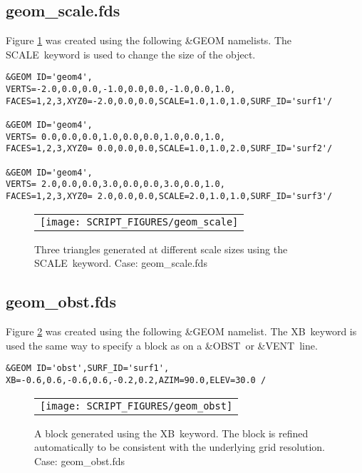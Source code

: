 \documentclass[12pt]{article}
\begin{document}
\subsection{geom\_scale.fds}
Figure \ref{fig:geom_scale} was created using the following \&GEOM namelists.
The {\ct SCALE}\ keyword is used to change the size of the object.

{\small
\begin{verbatim}
&GEOM ID='geom4',
VERTS=-2.0,0.0,0.0,-1.0,0.0,0.0,-1.0,0.0,1.0,
FACES=1,2,3,XYZ0=-2.0,0.0,0.0,SCALE=1.0,1.0,1.0,SURF_ID='surf1'/

&GEOM ID='geom4',
VERTS= 0.0,0.0,0.0,1.0,0.0,0.0,1.0,0.0,1.0,
FACES=1,2,3,XYZ0= 0.0,0.0,0.0,SCALE=1.0,1.0,2.0,SURF_ID='surf2'/

&GEOM ID='geom4',
VERTS= 2.0,0.0,0.0,3.0,0.0,0.0,3.0,0.0,1.0,
FACES=1,2,3,XYZ0= 2.0,0.0,0.0,SCALE=2.0,1.0,1.0,SURF_ID='surf3'/
\end{verbatim}
}

\begin{figure}[\figoptions]
\begin{center}
\begin{tabular}{c}
 \texttt{[image: SCRIPT\_FIGURES/geom\_scale]}
  \end{tabular}
\end{center}
\caption{Three triangles generated at different scale sizes using the {\ct SCALE}\ keyword. Case: geom\_scale.fds}
\label{fig:geom_scale}
\end{figure}

\subsection{geom\_obst.fds}
Figure \ref{fig:geom_obst} was created using the following \&GEOM namelist.
The {\ct XB}\ keyword is used the same way to specify a block as on
a {\ct \&OBST}\ or {\ct \&VENT}\ line.

{\scriptsize
\begin{verbatim}
&GEOM ID='obst',SURF_ID='surf1', XB=-0.6,0.6,-0.6,0.6,-0.2,0.2,AZIM=90.0,ELEV=30.0 /
\end{verbatim}
}

\begin{figure}[\figoptions]
\begin{center}
\begin{tabular}{c}
 \texttt{[image: SCRIPT\_FIGURES/geom\_obst]}
  \end{tabular}
\end{center}
 \caption{A block generated using the {\ct XB}\ keyword.  The block is refined automatically to be consistent with the underlying grid resolution. Case: geom\_obst.fds}
\label{fig:geom_obst}
\end{figure}
\end{document}
